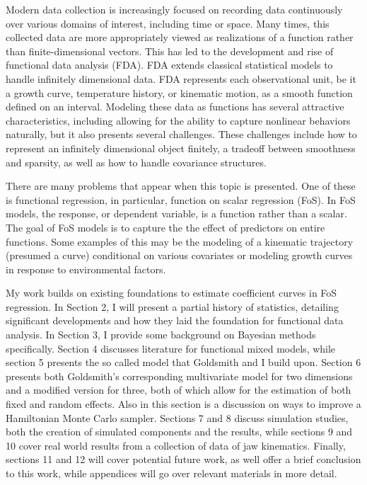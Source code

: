 Modern data collection is increasingly focused on recording data continuously over various domains of interest, including time or space.  
Many times, this collected data are more appropriately viewed as realizations of a function rather than finite-dimensional vectors.  
This has led to the development and rise of functional data analysis (FDA).  
FDA extends classical statistical models to handle infinitely dimensional data.  
FDA represents each observational unit, be it a growth curve, temperature history, or kinematic motion, as a smooth function defined on an interval.  
Modeling these data as functions has several attractive characteristics, including allowing for the ability to capture nonlinear behaviors naturally, but it also presents several challenges.  
These challenges include how to represent an infinitely dimensional object finitely, a tradeoff between smoothness and sparsity, as well as how to handle covariance structures.  

There are many problems that appear when this topic is presented.  
One of these is functional regression, in particular, function on scalar regression (FoS).  
In FoS models, the response, or dependent variable, is a function rather than a scalar.  
The goal of FoS models is to capture the the effect of predictors on entire functions.  
Some examples of this may be the modeling of a kinematic trajectory (presumed a curve) conditional on various covariates or modeling growth curves in response to environmental factors.  

My work builds on existing foundations to estimate coefficient curves in FoS regression.  
In Section 2, I will present a partial history of statistics, detailing significant developments and how they laid the foundation for functional data analysis.  
In Section 3, I provide some background on Bayesian methods specifically. 
Section 4 discusses literature for functional mixed models, while section 5 presents the so called  model that Goldsmith and I build upon.  
Section 6 presents both Goldsmith's corresponding  multivariate model for two dimensions and a modified version for three, both of which allow for the estimation of both fixed and random effects.  
Also in this section is a discussion on ways to improve a Hamiltonian Monte Carlo sampler.  
Sections 7 and 8 discuss simulation studies, both the creation of simulated components and the results, while sections 9 and 10 cover real world results from a collection of data of jaw kinematics.  
Finally, sections 11 and 12 will cover potential future work, as well offer a brief conclusion to this work, while appendices will go over relevant materials in more detail.